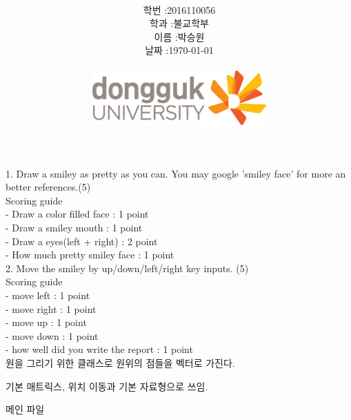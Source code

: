 \documentclass[12pt,a4paper]{article}
\title{
	\centering
	\pgfornament[width=12cm,color=teal]{84}\\
	\vspace{1cm}
	\fontsize{50}{50} \selectfont {컴퓨터 그래픽스 입문}\\
		\pgfornament[width=12cm,color=teal]{88}\\
	\vfill}
\author{
	\LARGE
	\begin{tabular}{rl}
		\hline
		학번 : & 2016110056\\ 
		학과 : & 불교학부 \\
		이름 : & 박승원\\
		날짜 : & \today\\
		\hline
	\end{tabular}\vspace{2cm}
	\\
\includegraphics[width=0.5\textwidth]{logo.jpg}
	}
\date{}
\begin{document}
\maketitle
{}
\noindent
\lstset{language=C++, columns=flexible, tabsize=4, frame=shadowbox, showstringspaces=false, breaklines=true, upquote=true, basicstyle=\normalsize}


1. Draw a smiley as pretty as you can. You may google 'smiley face' for more an better references.(5)\\
Scoring guide\\
- Draw a color filled face : 1 point\\
- Draw a smiley mouth : 1 point\\
- Draw a eyes(left + right) : 2 point\\
- How much pretty smiley face  : 1 point\\

2. Move the smiley by up/down/left/right key inputs. (5)\\
Scoring guide\\
- move left : 1 point\\
- move right : 1 point\\
- move up : 1 point\\
- move down : 1 point\\
- how well did you write the report : 1 point\\

원을 그리기 위한 클래스로 원위의 점들을 벡터로 가진다.


기본 매트릭스, 위치 이동과 기본 자료형으로 쓰임.


메인 파일
	
	
\end{document}

